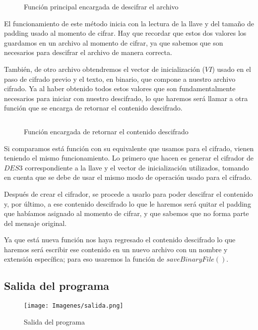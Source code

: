 \documentclass[10pt]{article}
\begin{document}
   		\begin{figure}[H]
			\inputminted[linenos, firstnumber=1, breaklines, tabsize=4, firstline=128, lastline=140]{python}{code/App.py}
			\caption{Función principal encargada de descifrar el archivo}
		\end{figure}

		El funcionamiento de este método inicia con la lectura de la llave y del tamaño de padding usado al momento de cifrar. Hay que recordar que estos dos valores los guardamos en un archivo al momento de cifrar, ya que sabemos que son necesarios para descifrar el archivo de manera correcta. 

		También, de otro archivo obtendremos el vector de inicialización ($VI$) usado en el paso de cifrado previo y el texto, en binario, que compone a nuestro archivo cifrado. Ya al haber obtenido todos estos valores que son fundamentalmente necesarios para iniciar con nuestro descifrado, lo que haremos será llamar a otra función que se encarga de retornar el contenido descifrado.

		\begin{figure}[H]
			\inputminted[linenos, firstnumber=1, breaklines, tabsize=4, firstline=154, lastline=158 ]{python}{code/App.py}
			\caption{Función encargada de retornar el contenido descifrado}
		\end{figure}

		Si comparamos está función con su equivalente que usamos para el cifrado, vienen teniendo el mismo funcionamiento. Lo primero que hacen es generar el cifrador de $DES3$ correspondiente a la llave y el vector de inicialización utilizados, tomando en cuenta que se debe de usar el mismo modo de operación usado para el cifrado. 

		Después de crear el cifrador, se procede a usarlo para poder descifrar el contenido y, por último, a ese contenido descifrado lo que le haremos será quitar el padding que habíamos asignado al momento de cifrar, y que sabemos que no forma parte del mensaje original.

		Ya que está nueva función nos haya regresado el contenido descifrado lo que haremos será escribir ese contenido en un nuevo archivo con un nombre y extensión específica; para eso usaremos la función de $saveBinaryFile()$.

	\subsection{Salida del programa}
		\begin{figure}[H]
			\centering
			\texttt{[image: Imagenes/salida.png]}
		    \caption{Salida del programa}
		\end{figure}
\end{document}
